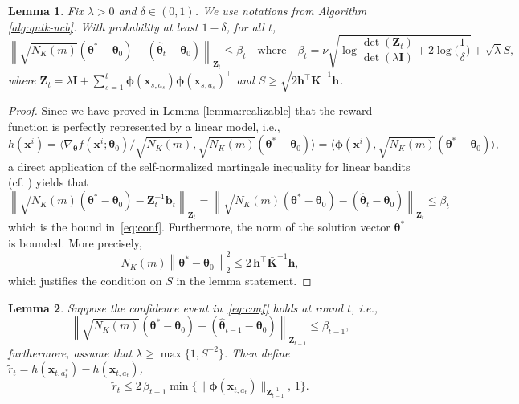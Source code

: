 \documentclass[pdflatex,sn-mathphys-num]{sn-jnl}%
\theoremstyle{thmstyleone}%
\theoremstyle{thmstyletwo}%
\theoremstyle{thmstylethree}%
\newtheorem{lemma}{Lemma}[section]
\newcommand{\norm}[1]{\left\lVert#1\right\rVert}
\newcommand{\xbf}{\mathbf{x}}
\newcommand{\Kbf}{\mathbf{K}}
\newcommand{\Ibf}{\mathbf{I}}
\newcommand{\hbf}{\mathbf{h}}
\newcommand{\phibf}{\bm{\phi}}
\newcommand{\Zbf}{\mathbf{Z}}
\newcommand{\bbf}{\mathbf{b}}
\newcommand{\thetabf}{\bm{\theta}}
\begin{document}
\begin{appendices}
\begin{lemma}\label{lem:selfnorm}
Fix $\lambda>0$ and $\delta\in(0,1)$. We use notations from Algorithm \ref{alg:qntk-ucb}. 
With probability at least $1-\delta$, for all $t$,
\begin{equation}
\label{eq:conf}
\norm{\sqrt{N_K(m)}({\thetabf}^* - {\thetabf}_0)-(\hat{\thetabf}_t-\thetabf_0)}_{\Zbf_t}  \leq \beta_t
\quad\mbox{where}\quad
\beta_{t} = \nu\sqrt{\log\frac{\det(\Zbf_{t})}{\det(\lambda \Ibf)} + 2\log\Big(\frac{1}{\delta}\Big)}
+\sqrt{\lambda}S,
\end{equation}
where $\Zbf_t = \lambda \Ibf + \sum^t_{s=1} \phibf(\xbf_{s,a_s})\phibf(\xbf_{s,a_s})^\top$ and $S\geq \sqrt{ 2\hbf^\top \bar{\Kbf}^{-1} \hbf  }$. %
\end{lemma}

\begin{proof}
Since we have proved in Lemma \ref{lemma:realizable} that the reward function is perfectly represented by a linear model, i.e., 
    $$ h(\xbf^i) = \langle \nabla_{\thetabf} f(\xbf^i;\thetabf_0)/\sqrt{N_K(m)}, \sqrt{N_K(m)}({\thetabf}^* - {\thetabf}_0) \rangle = \langle \phibf(\xbf^i), \sqrt{N_K(m)}({\thetabf}^* - {\thetabf}_0) \rangle, $$
 a direct application of the self-normalized martingale inequality for linear bandits
(cf. \cite[Theorem 2]{linucb2011}) yields that $$
\norm{\sqrt{N_K(m)}({\thetabf}^* - {\thetabf}_0)-\Zbf^{-1}_t\bbf_t}_{\Zbf_t}
=
\norm{\sqrt{N_K(m)}({\thetabf}^* - {\thetabf}_0)-(\hat{\thetabf}_t-\thetabf_0)}_{\Zbf_t}  \leq \beta_t
$$
which is the bound in~\eqref{eq:conf}.
Furthermore, the norm of the solution vector ${\thetabf}^*$ is bounded. More precisely, %
$$ N_K(m)\norm{{\thetabf}^* - {\thetabf}_0}_2^2 \le 2\, \hbf^\top \bar{\mathbf{K}}^{-1} \hbf, $$
which justifies the condition on $S$ in the lemma statement.
\end{proof}


























\begin{lemma}\label{lem:inst}
Suppose the
confidence event in~\eqref{eq:conf} holds at round $t$, i.e.,
\[
\norm{\sqrt{N_K(m)}({\thetabf}^* - {\thetabf}_0)-(\hat{\thetabf}_{t-1}-\thetabf_0)}_{\Zbf_{t-1}}  \leq \beta_{t-1},
\]
furthermore, assume that $\lambda \geq \max\{1,S^{-2}\}$. Then define $\widetilde{r}_t=h(\xbf_{t,a_t^*})-h(\xbf_{t,a_t})$,
\[
\widetilde{r}_t \le 2\,\beta_{t-1}\min\bigl\{\|\phibf(\xbf_{t,a_t})\|_{\Zbf_{t-1}^{-1}},\,1\bigr\}.
\]
\end{lemma}


\end{appendices}
\end{document}
